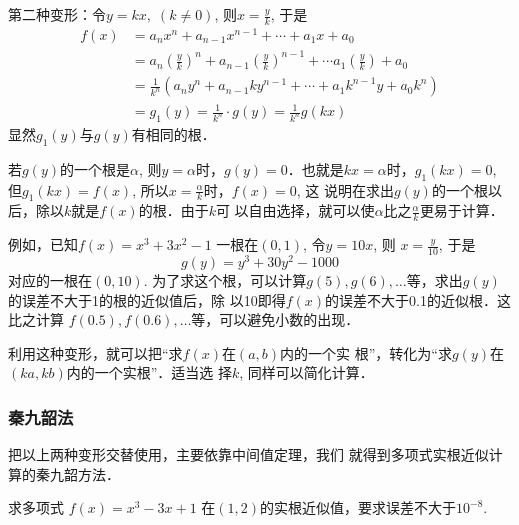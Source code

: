 第二种变形：令$y=kx,\; (k\ne 0)$, 则$x=\frac{y}{k}$, 于是
\[\begin{split}
    f(x)&=a_nx^n+a_{n-1}x^{n-1}+\cdots+a_1x+a_0\\
    &=a_n\left(\frac{y}{k}\right)^n+a_{n-1}\left(\frac{y}{k}\right)^{n-1}+\cdots a_1\left(\frac{y}{k}\right)+a_0\\
    &=\frac{1}{k^n}\left(a_ny^n+a_{n-1}ky^{n-1}+\cdots +a_1k^{n-1}y+a_0 k^n\right)\\
    &=g_1(y)=\frac{1}{k^n}\cdot g(y)=\frac{1}{k^n}g(kx)
\end{split} \]
显然$g_1(y)$与$g(y)$有相同的根．

若$g(y)$的一个根是$\alpha$, 则$y=\alpha$时，$g(y)=0$．也就是$kx=\alpha$时，$g_1(kx)=0$, 但$g_1(kx)=f(x)$, 所以$x=\frac{\alpha}{k}$时，$f(x)=0$, 这
说明在求出$g(y)$的一个根以后，除以$k$就是$f(x)$的根．由于$k$可
以自由选择，就可以使$\alpha$比之$\frac{\alpha}{k}$更易于计算．

例如，已知$f(x)=x^3+3x^2-1$
一根在$(0,1)$, 令$y=10x$, 则
$x=\frac{y}{10}$, 于是
\[g(y)=y^3+30y^2-1000\]
对应的一根在$(0,10)$. 为了求这个根，可以计算$g(5),
g(6),\ldots$等，求出$g(y)$的误差不大于1的根的近似值后，除
以10即得$f(x)$的误差不大于0.1的近似根．这比之计算
$f(0.5),f(0.6),\ldots$等，可以避免小数的出现．

利用这种变形，就可以把“求$f(x)$在$(a,b)$内的一个实
根”，转化为“求$g(y)$在$(ka,kb)$内的一个实根”．适当选
择$k$, 同样可以简化计算．

\subsubsection{秦九韶法}

把以上两种变形交替使用，主要依靠中间值定理，我们
就得到多项式实根近似计算的秦九韶方法．

\begin{example}
    求多项式
$f(x)=x^3-3x+1$
在$(1,2)$的实根近似值，要求误差不大于$10^{-8}$.
\end{example}

